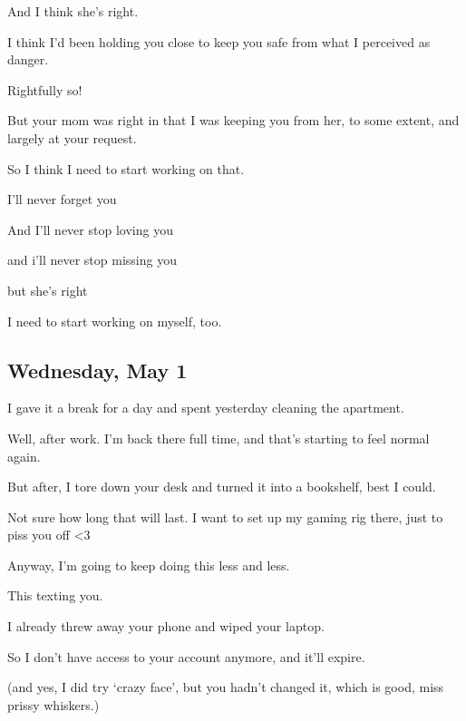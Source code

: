 {
And I think she's right.

I think I'd been holding you close
to keep you safe from what I perceived as danger.

Rightfully so!

But your mom was right in that I was
keeping you from her, to some extent, and largely at your request.

So I think I need to start working
on that.

I'll never forget you

And I'll never stop loving you

and i'll never stop missing you

but she's right

I need to start working on myself,
too.

\newpage

\subsection*{Wednesday, May 1}\label{wednesday-may-1}

I gave it a break for a day and
spent yesterday cleaning the apartment.

Well, after work. I'm back there
full time, and that's starting to feel normal again.

But after, I tore down your desk and
turned it into a bookshelf, best I could.

Not sure how long that will last. I
want to set up my gaming rig there, just to piss you off \textless{}3

Anyway, I'm going to keep doing this
less and less.

This texting you.

I already threw away your phone and
wiped your laptop.

So I don't have access to your
account anymore, and it'll expire.

(and yes, I did try `crazy face',
but you hadn't changed it, which is good, miss prissy whiskers.)

}
